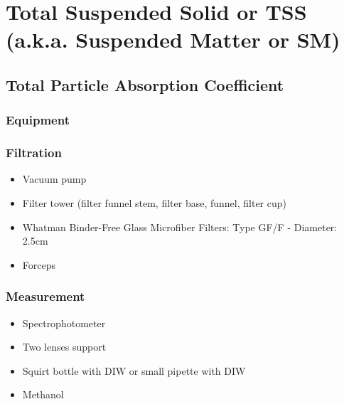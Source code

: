 \documentclass[]{spie}  %
\begin{document}
\newpage
\section{Total Suspended Solid or TSS (a.k.a. Suspended Matter or SM)}
\subsection{Total Particle Absorption Coefficient}
\subsubsection{Equipment}
\subsubsection*{Filtration}
\begin{itemize}
  \item Vacuum pump
  \item Filter tower (filter funnel stem, filter base, funnel, filter cup)
  \item Whatman Binder-Free Glass Microfiber Filters: Type GF/F - Diameter: 2.5cm
  \item Forceps
\end{itemize}
\subsubsection*{Measurement}
\begin{itemize}
  \item Spectrophotometer
  \item {\color{red} Two lenses support}
  \item Squirt bottle with {\color{red} DIW} or small pipette with {\color{red} DIW} 
  \item Methanol
\end{itemize}
\end{document}
